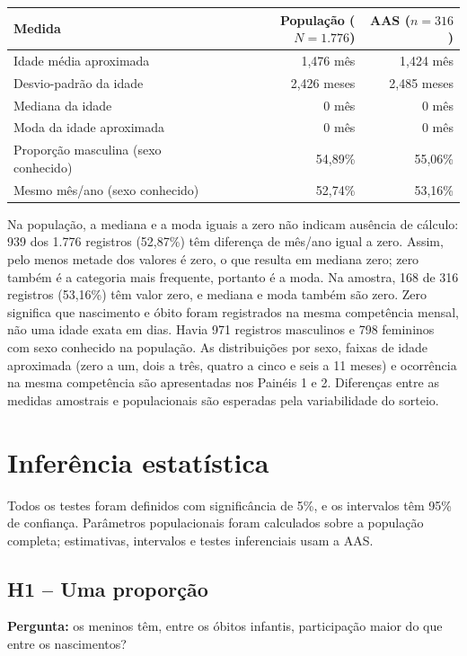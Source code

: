 \documentclass[12pt]{article}
\begin{document}
\begin{center}
\begin{tabular}{p{7cm}rr}
\toprule
Medida & População (\(N=1.776\)) & AAS (\(n=316\)) \\
\midrule
Idade média aproximada & 1,476 mês & 1,424 mês \\
Desvio-padrão da idade & 2,426 meses & 2,485 meses \\
Mediana da idade & 0 mês & 0 mês \\
Moda da idade aproximada & 0 mês & 0 mês \\
Proporção masculina (sexo conhecido) & 54,89\% & 55,06\% \\
Mesmo mês/ano (sexo conhecido) & 52,74\% & 53,16\% \\
\bottomrule
\end{tabular}
\end{center}

Na população, a mediana e a moda iguais a zero não indicam ausência de cálculo: 939 dos 1.776 registros (52,87\%) têm diferença de mês/ano igual a zero. Assim, pelo menos metade dos valores é zero, o que resulta em mediana zero; zero também é a categoria mais frequente, portanto é a moda. Na amostra, 168 de 316 registros (53,16\%) têm valor zero, e mediana e moda também são zero. Zero significa que nascimento e óbito foram registrados na mesma competência mensal, não uma idade exata em dias. Havia 971 registros masculinos e 798 femininos com sexo conhecido na população. As distribuições por sexo, faixas de idade aproximada (zero a um, dois a três, quatro a cinco e seis a 11 meses) e ocorrência na mesma competência são apresentadas nos Painéis 1 e 2. Diferenças entre as medidas amostrais e populacionais são esperadas pela variabilidade do sorteio.

\section{Inferência estatística}

Todos os testes foram definidos com significância de 5\%, e os intervalos têm 95\% de confiança. Parâmetros populacionais foram calculados sobre a população completa; estimativas, intervalos e testes inferenciais usam a AAS.

\subsection{H1 -- Uma proporção}

\textbf{Pergunta:} os meninos têm, entre os óbitos infantis, participação maior do que entre os nascimentos?
\end{document}
